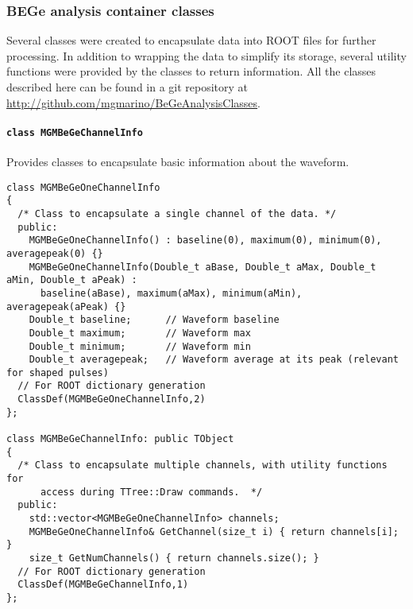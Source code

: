 			\subsubsection{BEGe analysis container classes}
Several classes were created to encapsulate data into ROOT files for further processing.  In addition to wrapping the data to simplify its storage, several utility functions were provided by the classes to return information.  All the classes described here can be found in a git repository at \url{http://github.com/mgmarino/BeGeAnalysisClasses}.  
				\paragraph{\lstinline!class MGMBeGeChannelInfo!}
Provides classes to encapsulate basic information about the waveform.
					\begin{lstlisting}
class MGMBeGeOneChannelInfo
{
  /* Class to encapsulate a single channel of the data. */
  public:
    MGMBeGeOneChannelInfo() : baseline(0), maximum(0), minimum(0), averagepeak(0) {}
    MGMBeGeOneChannelInfo(Double_t aBase, Double_t aMax, Double_t aMin, Double_t aPeak) : 
      baseline(aBase), maximum(aMax), minimum(aMin), averagepeak(aPeak) {}
    Double_t baseline;		// Waveform baseline
    Double_t maximum;		// Waveform max
    Double_t minimum; 		// Waveform min
    Double_t averagepeak; 	// Waveform average at its peak (relevant for shaped pulses)
  // For ROOT dictionary generation    
  ClassDef(MGMBeGeOneChannelInfo,2)
};

class MGMBeGeChannelInfo: public TObject
{
  /* Class to encapsulate multiple channels, with utility functions for
      access during TTree::Draw commands.  */
  public:
    std::vector<MGMBeGeOneChannelInfo> channels;
    MGMBeGeOneChannelInfo& GetChannel(size_t i) { return channels[i]; } 
    size_t GetNumChannels() { return channels.size(); }
  // For ROOT dictionary generation
  ClassDef(MGMBeGeChannelInfo,1)
};					
					\end{lstlisting}					
